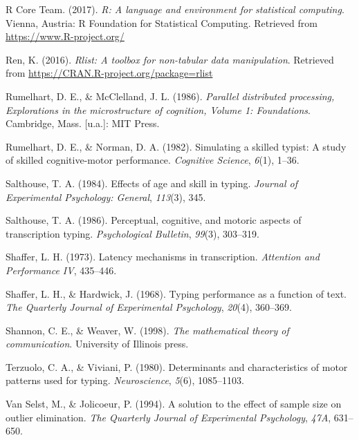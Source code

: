 \documentclass[floatsintext,man]{apa6}
\theoremstyle{definition}
\theoremstyle{definition}
\theoremstyle{definition}
\theoremstyle{remark}
\begin{document}
\hypertarget{ref-R-base}{}
R Core Team. (2017). \emph{R: A language and environment for statistical
computing}. Vienna, Austria: R Foundation for Statistical Computing.
Retrieved from \url{https://www.R-project.org/}

\hypertarget{ref-R-rlist}{}
Ren, K. (2016). \emph{Rlist: A toolbox for non-tabular data
manipulation}. Retrieved from
\url{https://CRAN.R-project.org/package=rlist}

\hypertarget{ref-rumelhart_parallel_1986}{}
Rumelhart, D. E., \& McClelland, J. L. (1986). \emph{Parallel
distributed processing, Explorations in the microstructure of cognition,
Volume 1: Foundations}. Cambridge, Mass. {[}u.a.{]}: MIT Press.

\hypertarget{ref-RumelhartSimulatingskilledtypist1982}{}
Rumelhart, D. E., \& Norman, D. A. (1982). Simulating a skilled typist:
A study of skilled cognitive-motor performance. \emph{Cognitive
Science}, \emph{6}(1), 1--36.

\hypertarget{ref-salthouse_effects_1984}{}
Salthouse, T. A. (1984). Effects of age and skill in typing.
\emph{Journal of Experimental Psychology: General}, \emph{113}(3), 345.

\hypertarget{ref-salthouse_perceptual_1986}{}
Salthouse, T. A. (1986). Perceptual, cognitive, and motoric aspects of
transcription typing. \emph{Psychological Bulletin}, \emph{99}(3),
303--319.

\hypertarget{ref-shaffer_latency_1973}{}
Shaffer, L. H. (1973). Latency mechanisms in transcription.
\emph{Attention and Performance IV}, 435--446.

\hypertarget{ref-shaffer_typing_1968}{}
Shaffer, L. H., \& Hardwick, J. (1968). Typing performance as a function
of text. \emph{The Quarterly Journal of Experimental Psychology},
\emph{20}(4), 360--369.

\hypertarget{ref-Shannonmathematicaltheorycommunication1998}{}
Shannon, C. E., \& Weaver, W. (1998). \emph{The mathematical theory of
communication}. University of Illinois press.

\hypertarget{ref-terzuolo_determinants_1980}{}
Terzuolo, C. A., \& Viviani, P. (1980). Determinants and characteristics
of motor patterns used for typing. \emph{Neuroscience}, \emph{5}(6),
1085--1103.

\hypertarget{ref-van_selst_solution_1994}{}
Van Selst, M., \& Jolicoeur, P. (1994). A solution to the effect of
sample size on outlier elimination. \emph{The Quarterly Journal of
Experimental Psychology}, \emph{47A}, 631--650.
\end{document}
